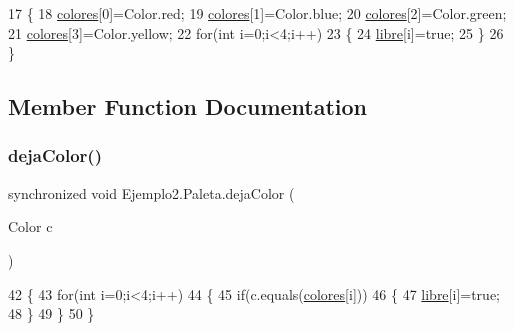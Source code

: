 \begin{DoxyCode}
17     \{
18         \mbox{\hyperlink{class_ejemplo2_1_1_paleta_ab6636b274dbb3f89739e635922ff7a75}{colores}}[0]=Color.red;
19         \mbox{\hyperlink{class_ejemplo2_1_1_paleta_ab6636b274dbb3f89739e635922ff7a75}{colores}}[1]=Color.blue;
20         \mbox{\hyperlink{class_ejemplo2_1_1_paleta_ab6636b274dbb3f89739e635922ff7a75}{colores}}[2]=Color.green;
21         \mbox{\hyperlink{class_ejemplo2_1_1_paleta_ab6636b274dbb3f89739e635922ff7a75}{colores}}[3]=Color.yellow;
22         \textcolor{keywordflow}{for}(\textcolor{keywordtype}{int} i=0;i<4;i++)
23         \{
24             \mbox{\hyperlink{class_ejemplo2_1_1_paleta_adb1708f360271b4d7c24a09aeed31f29}{libre}}[i]=\textcolor{keyword}{true};
25         \}
26     \}
\end{DoxyCode}


\subsection{Member Function Documentation}
\mbox{\label{class_ejemplo2_1_1_paleta_abe11e44a413ddff63a5758f67ace794b}} 
\subsubsection{\texorpdfstring{deja\+Color()}{dejaColor()}}
{\footnotesize\ttfamily synchronized void Ejemplo2.\+Paleta.\+deja\+Color (\begin{DoxyParamCaption}\item[{Color}]{c }\end{DoxyParamCaption})\hspace{0.3cm}{\ttfamily [inline]}}


\begin{DoxyCode}
42     \{
43         \textcolor{keywordflow}{for}(\textcolor{keywordtype}{int} i=0;i<4;i++)
44         \{
45             \textcolor{keywordflow}{if}(c.equals(\mbox{\hyperlink{class_ejemplo2_1_1_paleta_ab6636b274dbb3f89739e635922ff7a75}{colores}}[i]))
46             \{
47                 \mbox{\hyperlink{class_ejemplo2_1_1_paleta_adb1708f360271b4d7c24a09aeed31f29}{libre}}[i]=\textcolor{keyword}{true};
48             \}
49         \}
50     \}
\end{DoxyCode}
\mbox{\label{class_ejemplo2_1_1_paleta_a4b360ca77c1d02b9c06f5211effa22a0}} 
